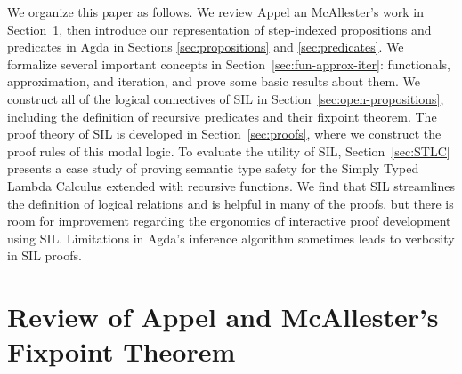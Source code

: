 \documentclass[acmsmall]{acmart}
\newcommand{\app}{\,}
\begin{document}
We organize this paper as follows. We review Appel an McAllester's
work in Section~\ref{sec:appel-mcallester}, then introduce our
representation of step-indexed propositions and predicates in Agda in
Sections \ref{sec:propositions} and \ref{sec:predicates}.  We
formalize several important concepts in
Section~\ref{sec:fun-approx-iter}: functionals, approximation, and
iteration, and prove some basic results about them.  We construct all
of the logical connectives of SIL in
Section~\ref{sec:open-propositions}, including the definition of
recursive predicates and their fixpoint theorem.  The proof theory of
SIL is developed in Section~\ref{sec:proofs}, where we construct the
proof rules of this modal logic.  To evaluate the utility of SIL,
Section~\ref{sec:STLC} presents a case study of proving semantic type
safety for the Simply Typed Lambda Calculus extended with recursive
functions. We find that SIL streamlines the definition of logical
relations and is helpful in many of the proofs, but there is room for
improvement regarding the ergonomics of interactive proof development
using SIL.  Limitations in Agda's inference algorithm sometimes leads
to verbosity in SIL proofs.


\section{Review of Appel and McAllester's Fixpoint Theorem}
\label{sec:appel-mcallester}
\end{document}
